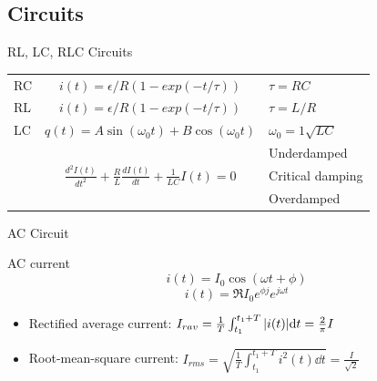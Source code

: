 \documentclass{beamer}
\begin{document}
\subsection{Circuits}

\begin{frame}{RL, LC, RLC Circuits}
    \begin{table}[htbp]
        \centering
        \begin{tabular}{l c l}
            \toprule
            RC                   & $i(t)=\epsilon/R(1-exp(-t/\tau))$                                                                 & $\tau=RC$               \\ \addlinespace[1em]
            RL                   & $i(t)=\epsilon/R(1-exp(-t/\tau))$                                                                 & $\tau=L/R$              \\ \addlinespace[1em]
            LC                   & $q(t) = A\sin(\omega_0 t) + B\cos(\omega_0 t)$                                                    & $\omega_0 = 1\sqrt{LC}$ \\ \addlinespace[1em]
            \multirow{3}{*}{RLC} & \multirow{3}{*}{$\frac{d^{2} I(t)}{d t^{2}}+\frac{R}{L} \frac{d I(t)}{d t}+\frac{1}{L C} I(t)=0$} & Underdamped             \\
                                 &                                                                                                   & Critical damping        \\
                                 &                                                                                                   & Overdamped              \\
            \bottomrule
        \end{tabular}
    \end{table}
\end{frame}


\begin{frame}{AC Circuit}
    \begin{block}{AC current}
        \begin{equation}
            i(t) = I_0 \cos(\omega t + \phi)
        \end{equation}
        \begin{equation}
            i(t) = \Re{I_0 e^{\phi j} e^{j\omega t}}
        \end{equation}
    \end{block}
    \begin{itemize}
        \item Rectified average current: $I_{rav} = \frac{1}{T}\int_{t_1}^{t_1+T}\abs{i(t)}\dd t = \frac{2}{\pi}I$
        \item Root-mean-square current: $I_{rms} = \sqrt{\frac{1}{T}\int_{t_1}^{t_1+T}i^2(t)\dd t} = \frac{I}{\sqrt{2}}$
    \end{itemize}
\end{frame}
\end{document}
